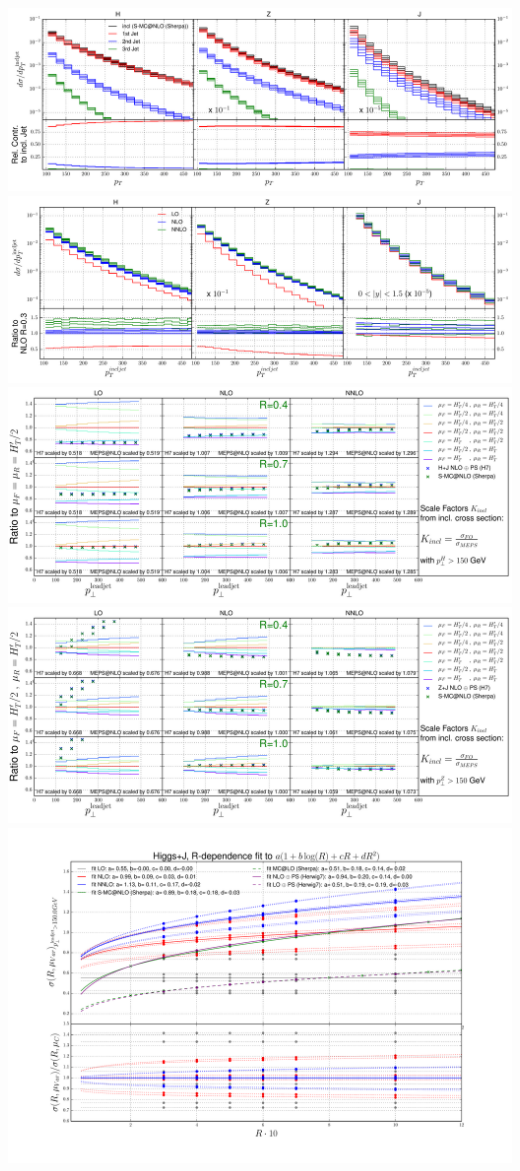 \documentclass[aps,prd,onecolumn,fleqn,superscriptaddress,groupedaddress,nofootinbib,preprintnumbers,nobalancelastpage]{revtex4}
\begin{document}
\includegraphics[width=\textwidth]{plots/Comparison_Contributions.pdf}
\includegraphics[width=\textwidth]{plots/Comparison_Plot.pdf}
\includegraphics[width=\textwidth]{plots/Fig_V_16_Higgs.pdf}
\includegraphics[width=\textwidth]{plots/Fig_V_16_ZJ.pdf}
\includegraphics[width=\textwidth]{plots/Fig_V_17_Higgs.pdf}
\end{document}
